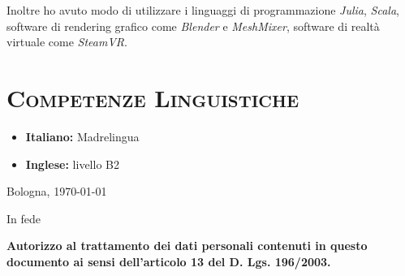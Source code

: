 \documentclass[a4paper,11pt]{article}
\newcommand\SignatureImage[2][]{%
  \IfFileExists{#2}{%
    \texttt{[image: \#2]}%
  }{%
    \hfill\makebox[2.0in]{\hrulefill}
  }%
}%
\newcommand{\itemicon}[2]{\item[{\texttt{[image: \#2]}}]}
\begin{document}
Inoltre ho avuto modo di utilizzare i linguaggi di programmazione \emph{Julia}, \emph{Scala}, software di rendering grafico come \emph{Blender} e \emph{MeshMixer}, software di realtà virtuale come \emph{SteamVR}.


\vspace*{0.5cm}
\section*{\scshape{Competenze Linguistiche}}

\begin{itemize}

  \itemicon{.05}{ita.png}\textbf{Italiano:} Madrelingua

  \itemicon{.05}{eng.png}\textbf{Inglese:} livello B2

\end{itemize}


\vspace*{0.5cm}
\quad


\begin{flushright}
Bologna, \today

In fede

\vspace*{0.5cm}

\begin{figure}[hb!]
  \begin{flushright}
    \SignatureImage[scale=0.5]{Firma.png}
  \end{flushright}
\end{figure}

\end{flushright}

\vspace*{\fill}
\textbf{Autorizzo al trattamento dei dati personali contenuti in questo documento ai sensi dell'articolo 13 del D. Lgs. 196/2003.}
\end{document}
